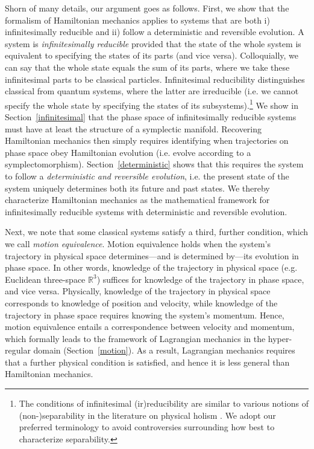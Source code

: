 \documentclass[12pt, english, twoside]{article} %
\begin{document}
Shorn of many details, our argument goes as follows. First, we show that the formalism of Hamiltonian mechanics applies to systems that are both i) infinitesimally reducible and ii) follow a deterministic and reversible evolution. A system is \textit{infinitesimally reducible} provided that the state of the whole system is equivalent to specifying the states of its parts (and vice versa). Colloquially, we can say that the whole state equals the sum of its parts, where we take these infinitesimal parts to be classical particles. Infinitesimal reducibility distinguishes classical from quantum systems, where the latter are irreducible (i.e. we cannot specify the whole state by specifying the states of its subsystems).\footnote{The conditions of infinitesimal (ir)reducibility are similar to various notions of (non-)separability in the literature on physical holism \parencites[46, 124]{Healey}. We adopt our preferred terminology to avoid controversies surrounding how best to characterize separability.} We show in Section~\ref{infinitesimal} that the phase space of infinitesimally reducible systems must have at least the structure of a symplectic manifold. Recovering Hamiltonian mechanics then simply requires identifying when trajectories on phase space obey Hamiltonian evolution  (i.e. evolve according to a symplectomorphism). Section~\ref{deterministic} shows that this requires the system to follow a \textit{deterministic and reversible evolution}, i.e. the present state of the system uniquely determines both its future and past states. We thereby characterize Hamiltonian mechanics as the mathematical framework for infinitesimally reducible systems with deterministic and reversible evolution.  

Next, we note that some classical systems satisfy a third, further condition, which we call \textit{motion equivalence}. Motion equivalence holds when the system's trajectory in physical space determines---and is determined by---its evolution in phase space. In other words, knowledge of the trajectory in physical space (e.g. Euclidean three-space $\mathbb{R}^3$) suffices for knowledge of the trajectory in phase space, and vice versa. Physically, knowledge of the trajectory in physical space corresponds to knowledge of position and velocity, while knowledge of the trajectory in phase space requires knowing the system's momentum. Hence, motion equivalence entails a correspondence between velocity and momentum, which formally leads to the framework of Lagrangian mechanics in the hyper-regular domain (Section~\ref{motion}). As a result, Lagrangian mechanics requires that a further physical condition is satisfied, and hence it is less general than Hamiltonian mechanics. 
\end{document}
